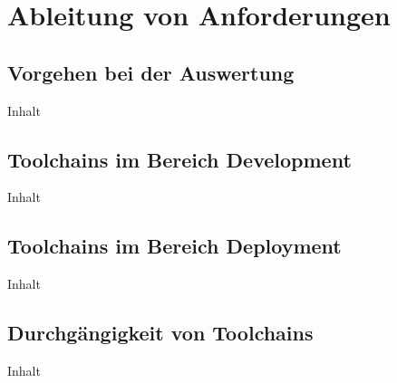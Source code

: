 \section{Ableitung von Anforderungen}
\label{sec:04-02_derivation-of-requirements}

\subsection{Vorgehen bei der Auswertung}
\label{subsec:04-02-01_procedure-for-evaluation}

Inhalt

\subsection{Toolchains im Bereich Development}
\label{subsec:04-02-02_toolchains-in-development}

Inhalt

\subsection{Toolchains im Bereich Deployment}
\label{subsec:04-02-03_toolchains-in-deployment}

Inhalt

\subsection{Durchgängigkeit von Toolchains}
\label{subsec:04-02-04_consistency-of-toolchains}

Inhalt
